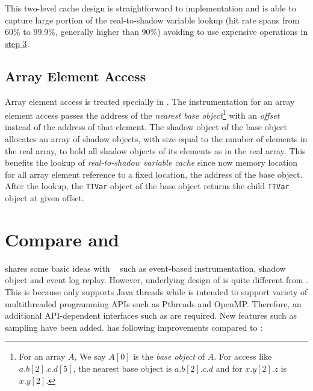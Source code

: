 This two-level cache design is straightforward to implementation and is able to capture large portion of the real-to-shadow variable lookup (hit rate spans from 60\% to 99.9\%, generally higher than 90\%) avoiding to use expensive operations in \hyperref[lbl:real-to-shadow-lookup-step3]{step 3}.

\subsection{Array Element Access}
Array element access is treated specially in \ThreadTracer{}. The instrumentation for an array element access passes the address of the \textit{nearest base object}\footnote{For an array $A$, We say $A[0]$ is the \textit{base object} of $A$. For access like $a.b[2].c.d[5]$, the nearest base object is $a.b[2].c.d$ and for $x.y[2].z$ is $x.y[2]$.} with an \textit{offset} instead of the address of that element. The shadow object of the base object allocates an array of shadow objects, with size equal to the number of elements in the real array, to hold all shadow objects of its elements as in the real array. This benefits the lookup of \textit{real-to-shadow variable cache} since now memory location for all array element reference to a fixed location, the address of the base object. After the lookup, the \verb|TTVar| object of the base object returns the child \verb|TTVar| object at given offset.

\section{Compare \RoadRunner{} and \ThreadTracer{}}
\label{s:ThreadTracer-Comparison}
\ThreadTracer{} shares some basic ideas with \RoadRunner{}~\cite{Flanagan:2010p71} such as event-based instrumentation, shadow object and event log replay. However, underlying design of \ThreadTracer{} is quite different from \RoadRunner{}. This is because \RoadRunner{} only supports Java threads while \ThreadTracer{} is intended to support variety of multithreaded programming APIs such as Pthreads and OpenMP. Therefore, an additional API-dependent interfaces such as \Rewriter{} are required. New features such as sampling have been added. \ThreadTracer{} has following improvements compared to \RoadRunner{}:

